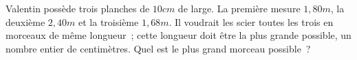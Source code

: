 %
%
Valentin possède trois planches de $10cm$ de large. La première mesure $1,80m$, la deuxième $2,40m$ et la troisième $1,68m$. Il voudrait les scier toutes les trois en morceaux de même longueur~; cette longueur doit être la plus grande possible, un nombre entier de centimètres. Quel est le plus grand morceau possible~?
